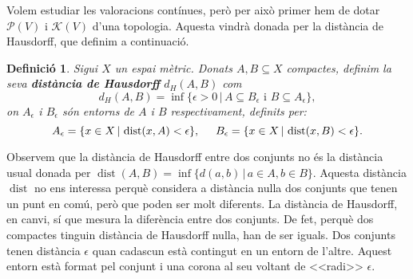\documentclass{article}
\newtheorem{definicio}{Definici\'{o}}
\theoremstyle{definition}
\DeclareMathOperator{\dist}{dist}
\begin{document}
Volem estudiar les valoracions cont\'{i}nues, per\`{o} per aix\`{o} primer hem de dotar $\mathcal{P}(V)$ i $\mathcal{K}(V)$ d'una topologia. Aquesta vindr\`{a} donada per la dist\`{a}ncia de Hausdorff, que definim a continuaci\'{o}.

\begin{definicio}
Sigui $X$ un espai m\`{e}tric. Donats $A,B\subseteq X$ compactes, definim la seva \textbf{dist\`{a}ncia de Hausdorff} $d_H(A,B)$ com
\[d_H(A,B)=\inf\{\epsilon>0\,|\,A\subseteq B_{\epsilon}\text{ i }B\subseteq A_{\epsilon}\},\]
on $A_{\epsilon}$ i $B_{\epsilon}$ s\'{o}n entorns de $A$ i $B$ respectivament, definits per:
\[A_{\epsilon}=\{x\in X\,|\,\dist(x,A)<\epsilon\},\hspace{5mm}B_{\epsilon}=\{x\in X\,|\,\dist(x,B)<\epsilon\}.\]
\end{definicio}

Observem que la dist\`{a}ncia de Hausdorff entre dos conjunts no \'{e}s la dist\`{a}ncia usual donada per $\dist(A,B)=\inf\{d(a,b)\,|\,a\in A,b\in B\}$. Aquesta dist\`{a}ncia $\dist$ no ens interessa perqu\`{e} considera a dist\`{a}ncia nul\textperiodcentered la dos conjunts que tenen un punt en com\'{u}, per\`{o} que poden ser molt diferents. La dist\`{a}ncia de Hausdorff, en canvi, s\'{i} que mesura la difer\`{e}ncia entre dos conjunts. De fet, perqu\`{e} dos compactes tinguin dist\`{a}ncia de Hausdorff nul\textperiodcentered la, han de ser iguals. Dos conjunts tenen dist\`{a}ncia $\epsilon$ quan cadascun est\`{a} contingut en un entorn de l'altre. Aquest entorn est\`{a} format pel conjunt i una corona al seu voltant de <<radi>> $\epsilon$.
\end{document}

